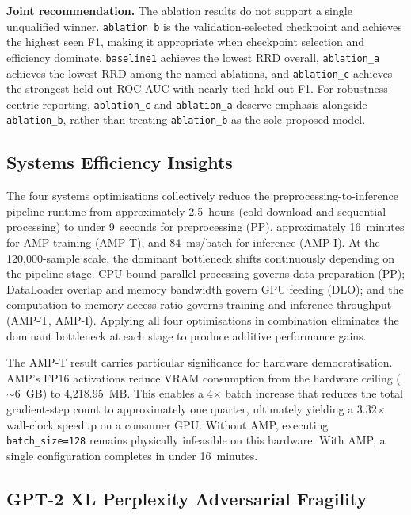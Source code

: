 \documentclass[conference]{IEEEtran}
\begin{document}
\textbf{Joint recommendation.} The ablation results do not support a single
unqualified winner. \texttt{ablation\_b} is the validation-selected checkpoint
and achieves the highest seen F1, making it appropriate when checkpoint
selection and efficiency dominate. \texttt{baseline1} achieves the lowest RRD
overall, \texttt{ablation\_a} achieves the lowest RRD among the named ablations,
and \texttt{ablation\_c} achieves the strongest held-out ROC-AUC with nearly
tied held-out F1. For robustness-centric reporting, \texttt{ablation\_c} and
\texttt{ablation\_a} deserve emphasis alongside \texttt{ablation\_b}, rather
than treating \texttt{ablation\_b} as the sole proposed model.

\subsection{Systems Efficiency Insights}\label{ssec:efficiency_insights}

The four systems optimisations collectively reduce the preprocessing-to-inference
pipeline runtime from approximately 2.5~hours (cold download and sequential
processing) to under 9~seconds for preprocessing (PP), approximately
16~minutes for AMP training (AMP-T), and 84~ms/batch for inference (AMP-I).
At the 120,000-sample scale, the dominant bottleneck shifts continuously
depending on the pipeline stage. CPU-bound parallel processing governs data
preparation (PP); DataLoader overlap and memory bandwidth govern GPU feeding
(DLO); and the computation-to-memory-access ratio governs training and
inference throughput (AMP-T, AMP-I). Applying all four optimisations in
combination eliminates the dominant bottleneck at each stage to produce
additive performance gains.

The AMP-T result carries particular significance for hardware democratisation.
AMP's FP16 activations reduce VRAM consumption from the hardware ceiling
($\sim$6~GB) to 4,218.95~MB. This enables a 4$\times$ batch increase that
reduces the total gradient-step count to approximately one quarter, ultimately
yielding a 3.32$\times$ wall-clock speedup on a consumer GPU. Without AMP,
executing \texttt{batch\_size=128} remains physically infeasible on this
hardware. With AMP, a single configuration completes in under 16~minutes.

\subsection{GPT-2 XL Perplexity Adversarial Fragility}\label{ssec:perplexity_adversarial}
\end{document}
